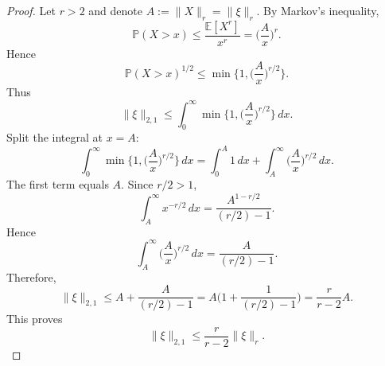 \documentclass[12pt]{article}
\renewcommand{\(}{\left(}%
\renewcommand{\)}{\right)}%
\renewcommand{\[}{\left[}%
\renewcommand{\]}{\right]}%
\newtheorem{proof}{Proof.}}
\begin{document}
\begin{proof}
Let $r>2$ and denote $A:=\|X\|_r=\|\xi\|_r$.
By Markov's inequality,
\begin{equation*}
\mathbb P(X>x)
\le
\frac{\mathbb E[X^r]}{x^r}
=
\Big(\frac{A}{x}\Big)^r.
\end{equation*}
Hence
\begin{equation*}
\mathbb P(X>x)^{1/2}
\le
\min\Big\{1,\Big(\frac{A}{x}\Big)^{r/2}\Big\}.
\end{equation*}
Thus
\begin{equation*}
\|\xi\|_{2,1}
\le
\int_0^\infty
\min\Big\{1,\Big(\frac{A}{x}\Big)^{r/2}\Big\}\,dx.
\end{equation*}
Split the integral at $x=A$:
\begin{equation*}
\int_0^\infty
\min\Big\{1,\Big(\frac{A}{x}\Big)^{r/2}\Big\}\,dx
=
\int_0^A 1\,dx
+
\int_A^\infty \Big(\frac{A}{x}\Big)^{r/2}\,dx.
\end{equation*}
The first term equals $A$. Since $r/2>1$,
\begin{equation*}
\int_A^\infty x^{-r/2}\,dx
=
\frac{A^{1-r/2}}{(r/2)-1}.
\end{equation*}
Hence
\begin{equation*}
\int_A^\infty \Big(\frac{A}{x}\Big)^{r/2}\,dx
=
\frac{A}{(r/2)-1}.
\end{equation*}
Therefore,
\begin{equation*}
\|\xi\|_{2,1}
\le
A + \frac{A}{(r/2)-1}
=
A\Big(1+\frac{1}{(r/2)-1}\Big)
=
\frac{r}{r-2}A.
\end{equation*}
This proves
\begin{equation*}
\|\xi\|_{2,1}
\le
\frac{r}{r-2}\|\xi\|_r.
\end{equation*}
\end{proof}
\end{document}
